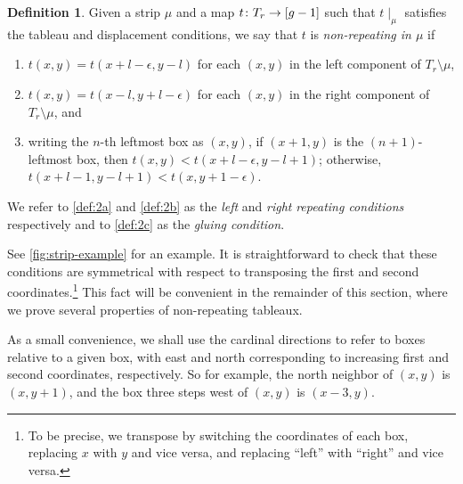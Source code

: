 \documentclass[11pt,reqno]{amsart}
\newcommand*{\maps}{\nobreak\mskip2mu\mathpunct{}\nonscript
  \mkern-\thinmuskip{:}\mskip6muplus1mu\relax}
\newcommand*{\restrict}[1]{{\mid}_{#1}}
\newcommand{\steven}[1]{\textcolor{pink}{\sf S: [#1]}}
\theoremstyle{definition}
\newtheorem{definition}{Definition}[section]
\theoremstyle{problem}
\theoremstyle{plain}
\theoremstyle{remark}
\theoremstyle{theorem}
\numberwithin{equation}{section}
\numberwithin{figure}{section}
\begin{document}
\begin{definition}\label{def:2}
  Given a strip $\mu$ and a map $t\maps T_r \to [g-1]$ such that
  $t\restrict{\mu}$ satisfies the tableau and displacement conditions,
  we say that $t$ is \textit{non-repeating in $\mu$} if
  \begin{enumerate}
  \item\label{def:2a} $t(x,y) = t(x+l-\epsilon,y-l)$ for each $(x,y)$
    in the left component of $T_r\setminus\mu$,
  \item\label{def:2b} $t(x,y) = t(x-l,y+l-\epsilon)$ for each $(x,y)$
    in the right component of $T_r\setminus\mu$, and
  \item\label{def:2c} writing the $n$-th leftmost box as $(x,y)$, if
    $(x+1,y)$ is the $(n+1)$-leftmost box, then
    $t(x,y) < t(x+l-\epsilon,y-l+1)$; otherwise,
    $t(x+l-1,y-l+1) < t(x,y+1-\epsilon)$.
  \end{enumerate}
  We refer to \ref{def:2a} and \ref{def:2b} as the \textit{left} and
  \textit{right} \textit{repeating conditions} respectively and to
  \ref{def:2c} as the \emph{gluing condition}.
\end{definition}

See \cref{fig:strip-example} for an example.  It is straightforward to
check that these conditions are symmetrical with respect to
transposing the first and second coordinates.\footnote{To be precise,
  we transpose by switching the coordinates of each box, replacing $x$
  with $y$ and vice versa, and replacing ``left'' with ``right'' and
  vice versa.}  This fact will be convenient in the remainder of this
section, where we prove several properties of non-repeating tableaux.

As a small convenience, we shall use the cardinal directions to refer
to boxes relative to a given box, with east and north corresponding to
increasing first and second coordinates, respectively.  So for
example, the north neighbor of $(x,y)$ is $(x,y+1)$, and the box three
steps west of $(x,y)$ is $(x-3,y)$.
\end{document}
